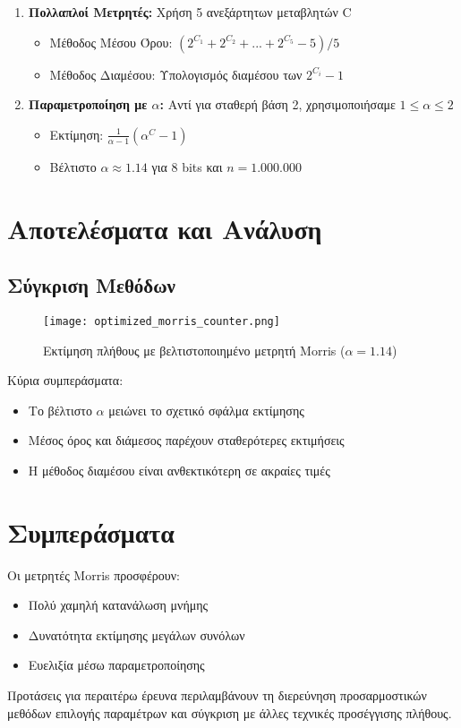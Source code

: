 \documentclass[12pt,a4paper]{article}
\begin{document}
\begin{enumerate}
\item \textbf{Πολλαπλοί Μετρητές:} Χρήση 5 ανεξάρτητων μεταβλητών C
\begin{itemize}
\item Μέθοδος Μέσου Όρου: $(2^{C_1} + 2^{C_2} + ... + 2^{C_5} - 5)/5$
\item Μέθοδος Διαμέσου: Υπολογισμός διαμέσου των $2^{C_i} - 1$
\end{itemize}


\item \textbf{Παραμετροποίηση με $\alpha$:} Αντί για σταθερή βάση 2, χρησιμοποιήσαμε $1 \leq \alpha \leq 2$
\begin{itemize}
    \item Εκτίμηση: $\frac{1}{\alpha-1}(\alpha^C - 1)$
    \item Βέλτιστο $\alpha \approx 1.14$ για 8 bits και $n = 1.000.000$
\end{itemize}

\end{enumerate}


\section{Αποτελέσματα και Ανάλυση}


\subsection{Σύγκριση Μεθόδων}


\begin{figure}[h!]
\centering
\texttt{[image: optimized\_morris\_counter.png]}
\caption{Εκτίμηση πλήθους με βελτιστοποιημένο μετρητή Morris ($\alpha = 1.14$)}
\end{figure}


Κύρια συμπεράσματα:
\begin{itemize}
\item Το βέλτιστο $\alpha$ μειώνει το σχετικό σφάλμα εκτίμησης
\item Μέσος όρος και διάμεσος παρέχουν σταθερότερες εκτιμήσεις
\item Η μέθοδος διαμέσου είναι ανθεκτικότερη σε ακραίες τιμές
\end{itemize}


\section{Συμπεράσματα}


Οι μετρητές Morris προσφέρουν:
\begin{itemize}
\item Πολύ χαμηλή κατανάλωση μνήμης
\item Δυνατότητα εκτίμησης μεγάλων συνόλων
\item Ευελιξία μέσω παραμετροποίησης
\end{itemize}


Προτάσεις για περαιτέρω έρευνα περιλαμβάνουν τη διερεύνηση προσαρμοστικών μεθόδων επιλογής παραμέτρων και σύγκριση με άλλες τεχνικές προσέγγισης πλήθους.
\end{document}
